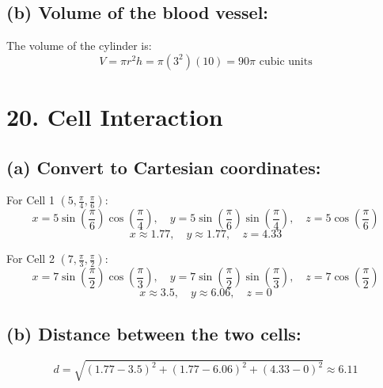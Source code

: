 \documentclass[11pt]{article}
\begin{document}
\subsection*{(b) Volume of the blood vessel:}
The volume of the cylinder is:
\[
V = \pi r^2 h = \pi (3^2)(10) = 90\pi \text{ cubic units}
\]

\section*{20. Cell Interaction}
\subsection*{(a) Convert to Cartesian coordinates:}

For Cell 1 \((5, \frac{\pi}{4}, \frac{\pi}{6})\):
\[
x = 5 \sin\left( \frac{\pi}{6} \right) \cos\left( \frac{\pi}{4} \right), \quad y = 5 \sin\left( \frac{\pi}{6} \right) \sin\left( \frac{\pi}{4} \right), \quad z = 5 \cos\left( \frac{\pi}{6} \right)
\]
\[
x \approx 1.77, \quad y \approx 1.77, \quad z = 4.33
\]

For Cell 2 \((7, \frac{\pi}{3}, \frac{\pi}{2})\):
\[
x = 7 \sin\left( \frac{\pi}{2} \right) \cos\left( \frac{\pi}{3} \right), \quad y = 7 \sin\left( \frac{\pi}{2} \right) \sin\left( \frac{\pi}{3} \right), \quad z = 7 \cos\left( \frac{\pi}{2} \right)
\]
\[
x \approx 3.5, \quad y \approx 6.06, \quad z = 0
\]

\subsection*{(b) Distance between the two cells:}
\[
d = \sqrt{(1.77 - 3.5)^2 + (1.77 - 6.06)^2 + (4.33 - 0)^2} \approx 6.11
\]
\end{document}

